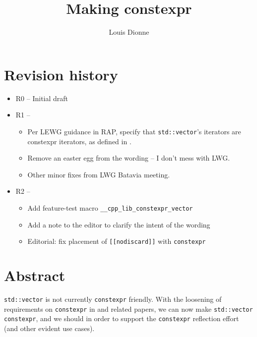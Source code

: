 \documentclass{wg21}
\title{Making \cc{std::vector} constexpr}
\author{Louis Dionne}{ldionne@apple.com}
\newcommand{\cc}[1]{\texttt{#1}}
\begin{document}
\maketitle

\section{Revision history}
\begin{itemize}
  \item R0 -- Initial draft
  \item R1 -- \begin{itemize}
              \item Per LEWG guidance in RAP, specify that \cc{std::vector}'s
                    iterators are constexpr iterators, as defined in \cite{P0858R0}.
              \item Remove an easter egg from the wording -- I don't mess
                    with LWG.
              \item Other minor fixes from LWG Batavia meeting.
              \end{itemize}
  \item R2 -- \begin{itemize}
              \item Add feature-test macro \cc{__cpp_lib_constexpr_vector}
              \item Add a note to the editor to clarify the intent of the wording
              \item Editorial: fix placement of \cc{[[nodiscard]]} with \cc{constexpr}
              \end{itemize}
\end{itemize}


\section{Abstract}
\cc{std::vector} is not currently \cc{constexpr} friendly. With the loosening
of requirements on \cc{constexpr} in \cite{P0784R1} and related papers, we
can now make \cc{std::vector} \cc{constexpr}, and we should in order to support
the \cc{constexpr} reflection effort (and other evident use cases).
\end{document}
